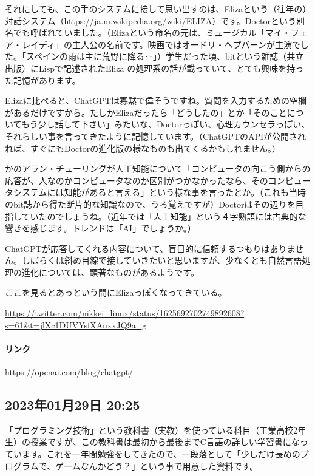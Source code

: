 それにしても、この手のシステムに接して思い出すのは、Elizaという（往年の）対話システム（\url{https://ja.m.wikipedia.org/wiki/ELIZA}）です。Doctorという別名でも呼ばれていました。（Elizaという命名の元は、ミュージカル「マイ・フェア・レイディ」の主人公の名前です。映画ではオードリ・ヘプバーンが主演でした。「スペインの雨は主に荒野に降る‥」）学生だった頃、bitという雑誌（共立出版）にLispで記述されたEliza の処理系の話が載っていて、とても興味を持った記憶があります。

Elizaに比べると、ChatGPTは寡黙で偉そうですね。質問を入力するための空欄があるだけですから。たしかElizaだったら「どうしたの」とか「そのことについてもう少し話して下さい」みたいな、Doctorっぽい、心理カウンセラっぽい、それらしい事を言ってきたように記憶しています。（ChatGPTのAPIが公開されれば、すぐにもDoctorの進化版の様なものも出てくるかもしれません。）

かのアラン・チューリングが人工知能について「コンピュータの向こう側からの応答が、人なのかコンピュータなのか区別がつかなかったなら、そのコンピュータシステムには知能があると言える」という様な事を言ったとか。（これも当時のbit誌から得た断片的な知識なので、うろ覚えですが）Doctorはその辺りを目指していたのでしょうね。（近年では「人工知能」という４字熟語には古典的な響きを感じます。トレンドは「AI」でしょうか。）

ChatGPTが応答してくれる内容について、盲目的に信頼するつもりはありません。しばらくは斜め目線で接していきたいと思いますが、少なくとも自然言語処理の進化については、顕著なものがあるようです。

ここを見るとあっという間にElizaっぽくなってきている。

\url{https://twitter.com/nikkei_linux/status/1625692702749892608?s=61&t=jlXc1DUVYsfXAuxxJQ9a_g}

\paragraph{リンク}
\url{https://openai.com/blog/chatgpt/}

\subsection*{2023年01月29日 20:25}

「プログラミング技術」という教科書（実教）を使っている科目（工業高校2年生）の授業ですが、この教科書は最初から最後までC言語の詳しい学習書になっています。これを一年間勉強をしてきたので、一段落として「少しだけ長めのプログラムで、ゲームなんかどう？」という事で用意した資料です。

